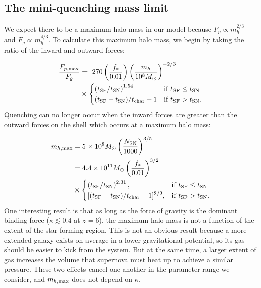 \documentclass[a4paper,11pt]{article}
\begin{document}
\subsection{The mini-quenching mass limit}  \label{sec:mh_max}

We expect there to be a maximum halo mass in our model because $F_{p} \propto m_{h}^{2/3}$ and $F_{g} \propto m_{h}^{4/3}$. To calculate this maximum halo mass, we begin by taking the ratio of the inward and outward forces:

\begin{align}
\frac{F_{p, \rm max}}{F_{g}} & = \ 270 \left( \frac{f_{*}}{0.01} \right) \left( \frac{m_{h}}{10^{8} M_{\odot}} \right)^{-2/3} \\
    & \times 
    \begin{cases}
        \left( t_{\rm SF} / t_{\rm SN} \right)^{1.54} & \text{if } t_{\rm SF} \leq t_{\rm SN}\\
        (t_{\rm SF} - t_{\rm SN})/t_{\rm char} + 1 & \text{if } t_{\rm SF} > t_{\rm SN}.
    \end{cases}
\end{align}
%
Quenching can no longer occur when the inward forces are greater than the outward forces on the shell which occurs at a maximum halo mass:

\begin{align}
m_{h, \rm max} & = 5 \times 10^{8} M_{\odot} \left( \frac{N_{\rm SN}}{1000} \right)^{3/5} \\
    & = 4.4 \times 10^{11} M_{\odot} \left( \frac{f_{*}}{0.01} \right)^{3/2} \\
    & \times 
    \begin{cases}
        \left( t_{\rm SF} / t_{\rm SN} \right)^{2.31}, & \text{if } t_{\rm SF} \leq t_{\rm SN} \\
        [(t_{\rm SF} - t_{\rm SN})/t_{\rm char} + 1]^{3/2},  & \text{if } t_{\rm SF} > t_{\rm SN}.
    \end{cases} \label{eq:mh_max}
\end{align}
%
One interesting result is that as long as the force of gravity is the dominant binding force ($\kappa \lesssim 0.4$ at $z = 6$), the maximum halo mass is not a function of the extent of the star forming region. This is not an obvious result because a more extended galaxy exists on average in a lower gravitational potential, so its gas should be easier to kick from the system. But at the same time, a larger extent of gas increases the volume that supernova must heat up to achieve a similar pressure. These two effects cancel one another in the parameter range we consider, and $m_{h, \rm max}$ does not depend on $\kappa$. 
\end{document}
